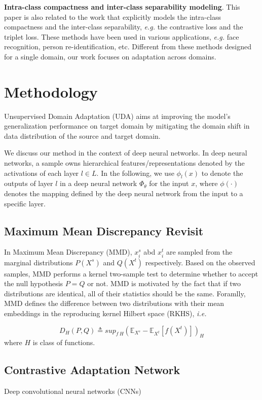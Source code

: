 \documentclass[conference]{IEEEtran}
\begin{document}
\textbf{Intra-class compactness and inter-class separability modeling}. This paper is also related to the work that explicitly models the intra-class compactness and the inter-class separability, \textit{e.g.} the contrastive loss and the triplet loss.
These methods have been used in various applications, \textit{e.g.} face recognition, person re-identification, etc.
Different from these methods designed for a single domain, our work focuses on adaptation across domains.

\section{Methodology}
Unsupervised Domain Adaptation (UDA) aims at improving the model's generalization performance on target domain by mitigating the domain shift in data distribution of the source and target domain.
\begin{comment}
Formally, given a set of source domain samples, $ S=  \{(x^s_1. y^s_1), \ldots, (x^s__{N_s}, y^s_{N_s}) \}$, and target domain samples $T = \{ x^t_1, \ldots, x^t_{N_t} \}, x^s, x^t$ represent the input data, and $y^s \in \{  0,1, \ldots, M-1 \} $ denote the source data label of $M$ classes. 
The target data label $y^t \in \{0,1, \ldots, M-1\}$ is unknown. Thus, in UDA, we are interested in training network using labeled source domain data $S$ and unlabeled target domain data $T$ to make accurate predictions $\{\hat{y}^t\}$ on $T$. 
\end{comment}

We discuss our method in the context of deep neural networks. In deep neural networks, a sample owns hierarchical features/representations denoted by the activations of each layer $l \in L$. In the following, we use $\phi_l(x)$ to denote the outputs of layer $l$ in a deep neural network $\Phi_{\theta}$ for the input $x$,
where $\phi(\cdot)$ denotes the mapping defined by the deep neural network from the input to a specific layer.

\subsection{Maximum Mean Discrepancy Revisit}
In Maximum Mean Discrepancy (MMD), ${x^s_i}$ abd ${x^t_i}$ are sampled from the marginal distributions $P(X^s)$ and $Q(X^t)$ respectively.
Based on the observed samples, MMD performs a kernel two-sample test to determine whether to accept the null hypothesis $P=Q$ or not.
MMD is motivated by the fact that if two distributions are identical, all of their statistics should be the same.
Foramlly, MMD defines the difference between two distributions with their mean embeddings in the reproducing kernel Hilbert space (RKHS), \textit{i.e.}

\begin{equation}
    D_H(P,Q) \triangleq sup_{f~H}(\mathbb{E}_{X^s}-\mathbb{E}_{X^t}[f(X^t)])_H
\end{equation}
where $H$ is class of functions.

\subsection{Contrastive Adaptation Network}
Deep convolutional neural networks (CNNs)


\end{document}
